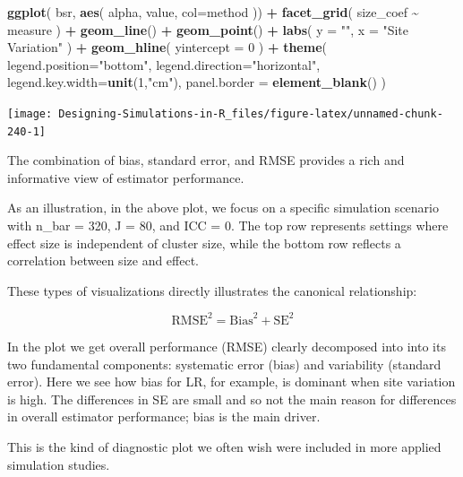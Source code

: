 \documentclass[
]{book}
\newenvironment{Shaded}{\begin{snugshade}}{\end{snugshade}}
\newcommand{\AttributeTok}[1]{\textcolor[rgb]{0.13,0.29,0.53}{#1}}
\newcommand{\DecValTok}[1]{\textcolor[rgb]{0.00,0.00,0.81}{#1}}
\newcommand{\FunctionTok}[1]{\textcolor[rgb]{0.13,0.29,0.53}{\textbf{#1}}}
\newcommand{\NormalTok}[1]{#1}
\newcommand{\SpecialCharTok}[1]{\textcolor[rgb]{0.81,0.36,0.00}{\textbf{#1}}}
\newcommand{\StringTok}[1]{\textcolor[rgb]{0.31,0.60,0.02}{#1}}
\begin{document}
\begin{Shaded}
\begin{Highlighting}[]
\FunctionTok{ggplot}\NormalTok{( bsr, }\FunctionTok{aes}\NormalTok{( alpha, value, }\AttributeTok{col=}\NormalTok{method )) }\SpecialCharTok{+}
  \FunctionTok{facet\_grid}\NormalTok{( size\_coef }\SpecialCharTok{\textasciitilde{}}\NormalTok{ measure ) }\SpecialCharTok{+}
  \FunctionTok{geom\_line}\NormalTok{() }\SpecialCharTok{+} \FunctionTok{geom\_point}\NormalTok{() }\SpecialCharTok{+}
  \FunctionTok{labs}\NormalTok{( }\AttributeTok{y =} \StringTok{""}\NormalTok{, }\AttributeTok{x =} \StringTok{"Site Variation"}\NormalTok{ )  }\SpecialCharTok{+}
  \FunctionTok{geom\_hline}\NormalTok{( }\AttributeTok{yintercept =} \DecValTok{0}\NormalTok{ ) }\SpecialCharTok{+}
  \FunctionTok{theme}\NormalTok{( }\AttributeTok{legend.position=}\StringTok{"bottom"}\NormalTok{,}
         \AttributeTok{legend.direction=}\StringTok{"horizontal"}\NormalTok{, }
         \AttributeTok{legend.key.width=}\FunctionTok{unit}\NormalTok{(}\DecValTok{1}\NormalTok{,}\StringTok{"cm"}\NormalTok{),}
         \AttributeTok{panel.border =} \FunctionTok{element\_blank}\NormalTok{() )}
\end{Highlighting}
\end{Shaded}

\begin{center}\texttt{[image: Designing-Simulations-in-R\_files/figure-latex/unnamed-chunk-240-1]} \end{center}

The combination of bias, standard error, and RMSE provides a rich and informative view of estimator performance.

As an illustration, in the above plot, we focus on a specific simulation scenario with n\_bar = 320, J = 80, and ICC = 0. The top row represents settings where effect size is independent of cluster size, while the bottom row reflects a correlation between size and effect.

These types of visualizations directly illustrates the canonical relationship:

\[ \text{RMSE}^2 = \text{Bias}^2 + \text{SE}^2 \]

In the plot we get overall performance (RMSE) clearly decomposed into into its two fundamental components: systematic error (bias) and variability (standard error).
Here we see how bias for LR, for example, is dominant when site variation is high.
The differences in SE are small and so not the main reason for differences in overall estimator performance; bias is the main driver.

This is the kind of diagnostic plot we often wish were included in more applied simulation studies.
\end{document}
